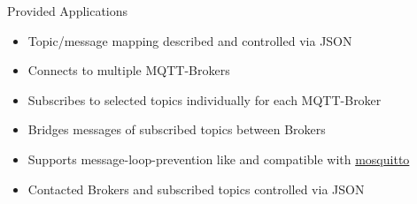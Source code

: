 \begin{frame}{Provided Applications}
\begin{description}[MQTTIntegrator]
\begin{itemize}
            \item Topic/message \alert{mapping described} and controlled \alert{via JSON}
        \end{itemize}
        \item [MQTTBridge]
        \begin{itemize}
            \item Connects to \alert{multiple} MQTT-\alert{Brokers}
            \item Subscribes to selected \alert{topics individually} for each MQTT-\alert{Broker}
            \item \alert{Bridges messages} of subscribed \alert{topics} between Brokers
            \item Supports \alert{message-loop-prevention} like and compatible with \href{https://mosquitto.org/}{\textcolor{fh-ooe-red}{mosquitto}}
            \item Contacted Brokers and subscribed topics controlled via \alert{JSON}
        \end{itemize}
    \end{description}
\end{frame}
